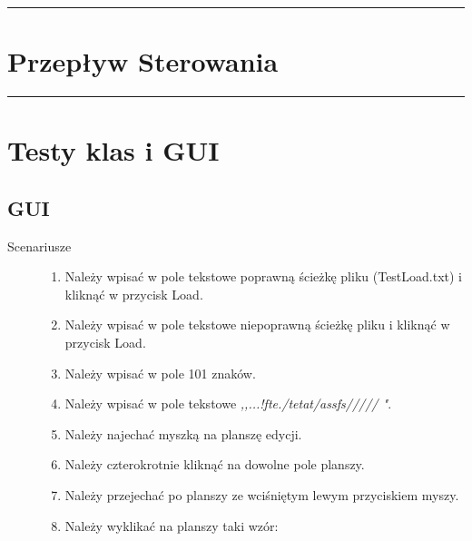 \documentclass[a4paper,11pt]{article}
\newcommand{\linia}{\rule{\linewidth}{0.4mm}}
\begin{document}
\noindent\linia
\section{Przepływ Sterowania}




\noindent\linia
\section{Testy klas i GUI}

\subsection{GUI}
\begin{description}

\item[Scenariusze] \hfill

\begin{enumerate}
\item Należy wpisać w pole tekstowe poprawną ścieżkę pliku (TestLoad.txt) i kliknąć w przycisk Load.
\item Należy wpisać w pole tekstowe niepoprawną ścieżkę pliku i kliknąć w przycisk Load.
\item Należy wpisać w pole 101 znaków.
\item Należy wpisać w pole tekstowe \textit{,,...!fte./tetat/assfs/////     "}.
\item Należy najechać myszką na planszę edycji.
\item Należy czterokrotnie kliknąć na dowolne pole planszy.
\item Należy przejechać po planszy ze wciśniętym lewym przyciskiem myszy.
\item Należy wyklikać na planszy taki wzór:


\end{enumerate}
\end{description}
\end{document}
